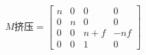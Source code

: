 $$
M挤压 =
\begin{bmatrix}
  n & 0 & 0 & 0 \\
  0 & n & 0 & 0 \\
  0 & 0 & n + f & -nf \\
  0 & 0 & 1 & 0
\end{bmatrix}
$$